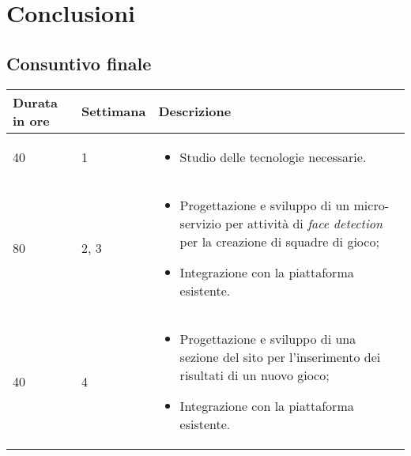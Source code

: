 
\chapter{Conclusioni}
\label{cap:conclusioni}

\section{Consuntivo finale}

\begin{center}
	
	\renewcommand{\arraystretch}{1.5}
	
	\centering
	\begin{longtable}{| C{2.5cm} | C{2cm} | L{7.2cm} |}
		
		\hline
		
		\textbf{Durata in ore} & \textbf{Settimana} & \textbf{Descrizione} \\
		
		\hline
		
		40 & 1 &
		\begin{itemize}[leftmargin=*]
			\item Studio delle tecnologie necessarie.
		\end{itemize} \\
		
		\hline
		
		80 & 2, 3 &
		\begin{itemize}[leftmargin=*]
			\item Progettazione e sviluppo di un micro-servizio per attività di \emph{face detection} per 
			la creazione di squadre di gioco;
			\item Integrazione con la piattaforma esistente. 
		\end{itemize}  \\
		
		\hline
		
		40 & 4 &
		\begin{itemize}[leftmargin=*]
			\item Progettazione e sviluppo di una sezione del sito per l'inserimento dei risultati di un nuovo gioco;
			\item Integrazione con la piattaforma esistente. 
		\end{itemize}  \\
		

\end{longtable}
\end{center}
